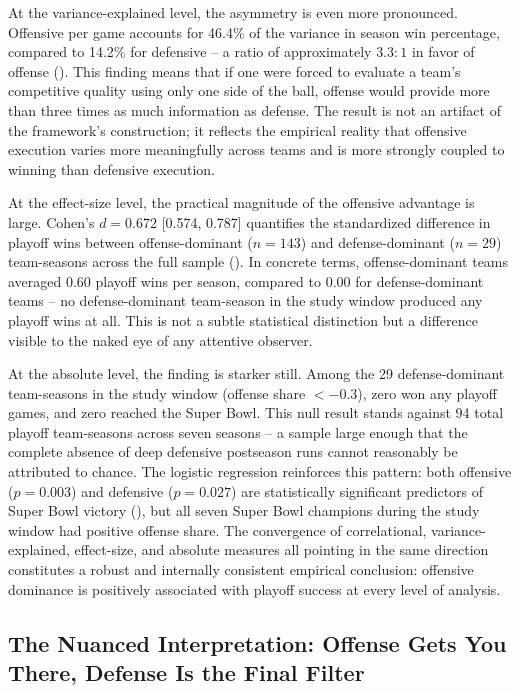 At the variance-explained level, the asymmetry is even more pronounced. Offensive
\xvoa{} per game accounts for 46.4\% of the variance in season win percentage,
compared to 14.2\% for defensive \xvoa{} -- a ratio of approximately $3.3 : 1$ in
favor of offense (). This finding means that if one
were forced to evaluate a team's competitive quality using only one side of the
ball, offense would provide more than three times as much information as defense.
The result is not an artifact of the \gds{} framework's construction; it reflects
the empirical reality that offensive execution varies more meaningfully across
teams and is more strongly coupled to winning than defensive execution.

At the effect-size level, the practical magnitude of the offensive advantage is
large. Cohen's $d = 0.672$ [0.574, 0.787] quantifies the standardized
difference in playoff wins between offense-dominant ($n = 143$) and
defense-dominant ($n = 29$) team-seasons across the full sample
(). In concrete terms, offense-dominant teams
averaged 0.60 playoff wins per season, compared to 0.00 for
defense-dominant teams -- no defense-dominant team-season in the study window
produced any playoff wins at all. This is not a subtle statistical
distinction but a difference visible to the naked eye of any attentive observer.

At the absolute level, the finding is starker still. Among the 29 defense-dominant
team-seasons in the study window (offense share $< -0.3$), zero won any
playoff games, and zero reached the Super Bowl. This null result stands against
94 total playoff team-seasons across seven seasons -- a sample large enough that
the complete absence of deep defensive postseason runs cannot reasonably be
attributed to chance. The logistic regression reinforces this pattern: both
offensive ($p = 0.003$) and defensive ($p = 0.027$) \xvoa{} are statistically
significant predictors of Super Bowl victory (), but
all seven Super Bowl champions during the study window had positive offense
share. The convergence of correlational, variance-explained, effect-size, and
absolute measures all pointing in the same direction constitutes a robust and
internally consistent empirical conclusion: offensive dominance is positively
associated with playoff success at every level of analysis.

\subsection{The Nuanced Interpretation: Offense Gets You There, Defense Is the Final Filter}
\label{sec:nuanced-interpretation}

